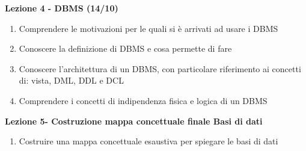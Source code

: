 \documentclass{article}
\begin{document}
	\begin{center}
	\textbf{Lezione 4 - DBMS (14/10)}
	\begin{enumerate}
	\item Comprendere le motivazioni per le quali si è arrivati ad usare i DBMS
	\item Conoscere la definizione di DBMS e cosa permette di fare
	\item Conoscere l'architettura di un DBMS, con particolare riferimento ai concetti di: vista, DML, DDL e DCL
	\item Comprendere i concetti di indipendenza fisica e logica di un DBMS
	\end{enumerate}
	\end{center}
	
	\begin{center}
	\textbf{Lezione 5- Costruzione mappa concettuale finale Basi di dati}
	\begin{enumerate}
	\item Costruire una mappa concettuale esaustiva per spiegare le basi di dati
	\end{enumerate}
	\end{center}
\end{document}
